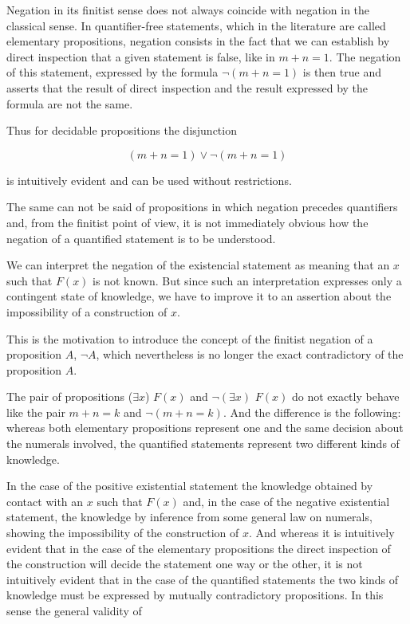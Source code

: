 \documentclass[12pt]{article}
\begin{document}
Negation in its finitist sense does not always coincide with negation in the classical sense. In quantifier-free statements, which in the literature are called elementary propositions, negation consists in the fact that we can establish by direct inspection that a given statement is false, like in $m + n = 1$. The negation of this statement, expressed by the formula $\neg (m + n = 1)$ is then true and asserts that the result of direct inspection and the result expressed by the formula are not the same.

Thus for decidable propositions the disjunction

$$(m + n =1) \vee \neg (m + n =1)$$

is intuitively evident and can be used without restrictions.

The same can not be said of propositions in which negation precedes quantifiers and, from the finitist point of view,  it is not immediately obvious how the negation of a quantified statement is to be understood.

We can interpret the negation of the existencial statement as meaning that an $x$ such that $F (x)$ is not known. But since such an interpretation expresses only a contingent state of knowledge, we have to improve it to an assertion about the impossibility of a construction of $x$.

This is the motivation to introduce the concept of the finitist negation of a proposition $A$, $\neg A$, which nevertheless is no longer the exact contradictory of the proposition $A$.
 
The pair of propositions ($\exists x$)  $F (x)$ and $\neg (\exists x)$ $F (x)$ do not exactly behave like the pair $m + n = k$ and $\neg (m + n = k)$. And the difference is the following: whereas both elementary propositions represent one and the same decision about the numerals involved, the quantified statements represent two different kinds of knowledge.

In the case of the positive existential statement the knowledge obtained by contact with an $x$ such that $F (x)$ and, in the case of the negative existential statement, the knowledge by inference from some general law on numerals, showing the impossibility of the construction of $x$. And whereas it is intuitively evident that in the case of the elementary propositions the direct inspection of the construction will decide the statement one way or the other, it is not intuitively evident that in the case of the quantified statements the two kinds of knowledge must be expressed by mutually contradictory propositions. In this sense the general validity of
 
\end{document}
